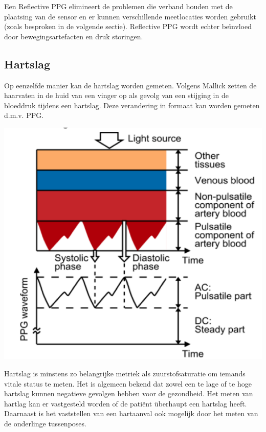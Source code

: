 \documentclass[11pt]{article}
\begin{document}
    Een Reflective PPG elimineert de problemen die verband houden met de plaatsing van de sensor en er kunnen verschillende meetlocaties worden gebruikt (zoals besproken in de volgende sectie). 
    Reflective PPG wordt echter beïnvloed door bewegingsartefacten en druk storingen. 

    \subsection{Hartslag}
    Op eenzelfde manier kan de hartslag worden gemeten. 
    Volgens Mallick \citep{mallick2016heart} zetten de haarvaten in de huid van een vinger op als gevolg van een stijging in de bloeddruk tijdens een hartslag. 
    Deze verandering in formaat kan worden gemeten d.m.v. PPG.

    \includegraphics[height=0.5\textheight]{Images/Tamura2.png}

    \citep[Image from][]{tamura2014wearable}
    
    Hartslag is  minstens zo belangrijke metriek als zuurstofsaturatie om iemands vitale status te meten. Het is algemeen bekend dat zowel een te lage of te hoge hartslag kunnen negatieve gevolgen hebben voor de gezondheid. 
    Het meten van hartlag kan er vastgesteld worden of de patiënt überhaupt een hartslag heeft.
    Daarnaast is het vaststellen van een hartaanval ook mogelijk door het meten van de onderlinge tussenposes. 
\end{document}
